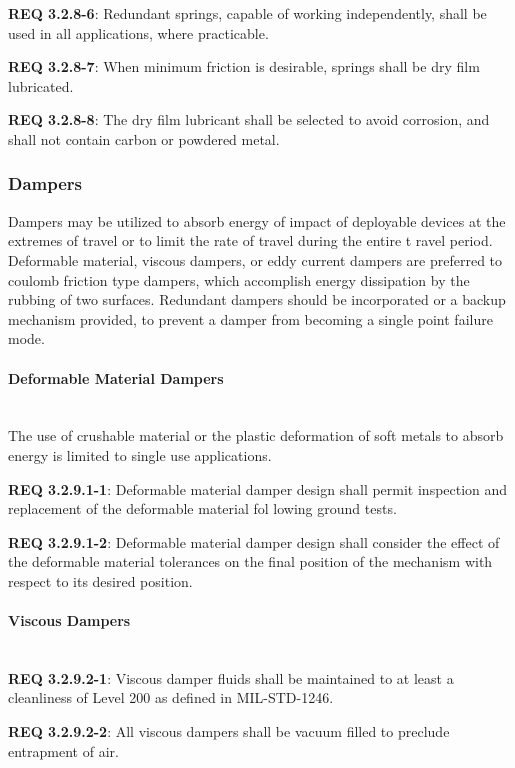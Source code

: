 \documentclass[12pt]{article}
\begin{document}
\noindent \textbf{REQ 3.2.8-6}: Redundant springs, capable of working independently, shall be used in all applications, where practicable. 

\noindent \textbf{REQ 3.2.8-7}: When minimum friction is desirable, springs shall be dry film lubricated. 

\noindent \textbf{REQ 3.2.8-8}: The dry film lubricant shall be selected to avoid corrosion, and shall not contain carbon or powdered metal.


\subsubsection{Dampers} %
Dampers may be utilized to absorb energy of impact of deployable devices at the extremes of travel or to limit the rate of travel during the entire t ravel period.
Deformable material, viscous dampers, or eddy current dampers are preferred to coulomb friction type dampers, which accomplish energy dissipation by the rubbing of two surfaces. 
Redundant dampers should be incorporated or a backup mechanism provided, to prevent a damper from becoming a single point failure mode.


\paragraph{Deformable Material Dampers} \mbox{} \\ %
The use of crushable material or the plastic deformation of soft metals to absorb energy is limited to single use applications. 

\noindent \textbf{REQ 3.2.9.1-1}: Deformable material damper design shall permit inspection and replacement of the deformable material fol lowing ground tests. 

\noindent \textbf{REQ 3.2.9.1-2}: Deformable material damper design shall consider the effect of the deformable material tolerances on the final position of the mechanism with respect to its desired position.


\paragraph{Viscous Dampers} \mbox{} \\ %
\noindent \textbf{REQ 3.2.9.2-1}: Viscous damper fluids shall be maintained to at least a cleanliness of Level 200 as defined in MIL-STD-1246. 

\noindent \textbf{REQ 3.2.9.2-2}: All viscous dampers shall be vacuum filled to preclude entrapment of air. 
\end{document}
